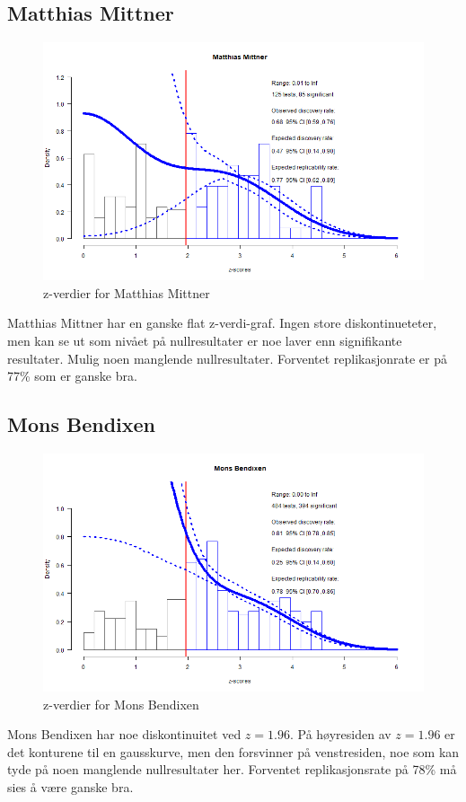 \documentclass[doc,norsk]{apa7}
\begin{document}
\subsection{Matthias Mittner}
\begin{figure}[h!]
    \centering
    \includegraphics[width=\textwidth]{images/Matthias Mittner.png}
    \caption{z-verdier for Matthias Mittner}
\end{figure}
Matthias Mittner har en ganske flat z-verdi-graf. Ingen store diskontinueteter, men kan se ut som nivået på nullresultater er noe laver enn signifikante resultater. Mulig noen manglende nullresultater. Forventet replikasjonrate er på 77\% som er ganske bra.

\subsection{Mons Bendixen}
\begin{figure}[h!]
    \centering
    \includegraphics[width=\textwidth]{images/Mons Bendixen.png}
    \caption{z-verdier for Mons Bendixen}
\end{figure}
Mons Bendixen har noe diskontinuitet ved $z=1.96$. På høyresiden av $z=1.96$ er det konturene til en gausskurve, men den forsvinner på venstresiden, noe som kan tyde på noen manglende nullresultater her. Forventet replikasjonsrate på 78\% må sies å være ganske bra.
\end{document}
